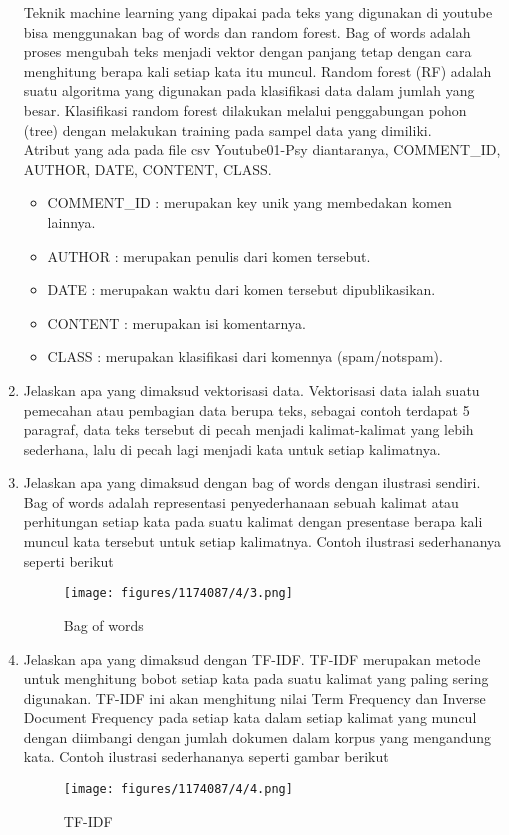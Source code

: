 \begin{enumerate}
	Teknik machine learning yang dipakai pada teks yang digunakan di youtube bisa menggunakan bag of words dan random forest. Bag of words adalah proses mengubah teks menjadi vektor dengan panjang tetap dengan cara menghitung berapa kali setiap kata itu muncul. Random forest (RF) adalah suatu algoritma yang digunakan pada klasifikasi data dalam jumlah yang besar. Klasifikasi random forest dilakukan melalui penggabungan pohon (tree) dengan melakukan training pada sampel data yang dimiliki.\\
	Atribut yang ada pada file csv Youtube01-Psy diantaranya, COMMENT\_ID, AUTHOR, DATE, CONTENT, CLASS.
	\begin{itemize}
		\item COMMENT\_ID : merupakan key unik yang membedakan komen lainnya.
		\item AUTHOR : merupakan penulis dari komen tersebut.
		\item DATE : merupakan waktu dari komen tersebut dipublikasikan.
		\item CONTENT : merupakan isi komentarnya.
		\item CLASS : merupakan klasifikasi dari komennya (spam/notspam).
	\end{itemize}

	\item Jelaskan apa yang dimaksud vektorisasi data.
	\hfill\break
	Vektorisasi data ialah suatu pemecahan atau pembagian data berupa teks, sebagai contoh terdapat 5 paragraf, data teks tersebut di pecah menjadi kalimat-kalimat yang lebih sederhana, lalu di pecah lagi menjadi kata untuk setiap kalimatnya. 

	\item Jelaskan apa yang dimaksud dengan bag of words dengan ilustrasi sendiri.
	\hfill\break
	Bag of words adalah representasi penyederhanaan sebuah kalimat atau perhitungan setiap kata pada suatu kalimat dengan presentase berapa kali muncul kata tersebut untuk setiap kalimatnya. Contoh ilustrasi sederhananya seperti berikut 

	\begin{figure}[H]
	\centering
		\texttt{[image: figures/1174087/4/3.png]}
		\caption{Bag of words}
	\end{figure}

	\item Jelaskan apa yang dimaksud dengan TF-IDF.
	\hfill\break
	TF-IDF merupakan metode untuk menghitung bobot setiap kata pada suatu kalimat yang paling sering digunakan. TF-IDF ini akan menghitung nilai Term Frequency dan Inverse Document Frequency pada setiap kata dalam setiap kalimat yang muncul dengan diimbangi dengan jumlah dokumen dalam korpus yang mengandung kata. Contoh ilustrasi sederhananya seperti gambar berikut 

	\begin{figure}[H]
	\centering
		\texttt{[image: figures/1174087/4/4.png]}
		\caption{TF-IDF}
	\end{figure}
\end{enumerate}


